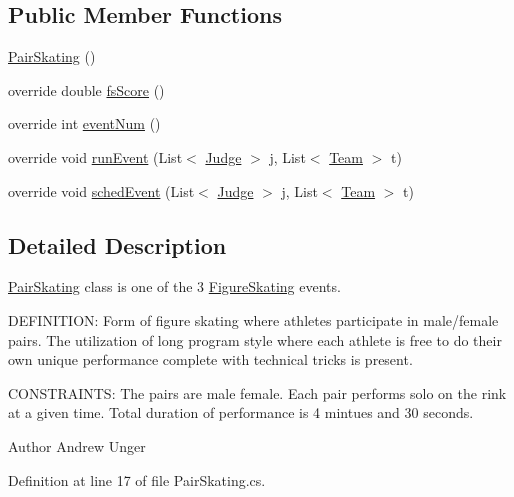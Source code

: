 \subsection*{Public Member Functions}
\begin{DoxyCompactItemize}
\item 
\hyperlink{classPCO_1_1PairSkating_afcb237a5c3a41d42ebe8902b5ef2a4ec}{Pair\+Skating} ()
\item 
override double \hyperlink{classPCO_1_1PairSkating_aaab23d1dec6f01ef77ec808be48d6b75}{fs\+Score} ()
\item 
override int \hyperlink{classPCO_1_1PairSkating_aaf3cda572c411560ddc8f2f44621ff18}{event\+Num} ()
\item 
override void \hyperlink{classPCO_1_1PairSkating_adc75a58b22ce9edd905cbbe06320c9a1}{run\+Event} (List$<$ \hyperlink{classPCO_1_1Judge}{Judge} $>$ j, List$<$ \hyperlink{classPCO_1_1Team}{Team} $>$ t)
\item 
override void \hyperlink{classPCO_1_1PairSkating_a7da01fe6e5c700bc232189087fddf450}{sched\+Event} (List$<$ \hyperlink{classPCO_1_1Judge}{Judge} $>$ j, List$<$ \hyperlink{classPCO_1_1Team}{Team} $>$ t)
\end{DoxyCompactItemize}


\subsection{Detailed Description}
\hyperlink{classPCO_1_1PairSkating}{Pair\+Skating} class is one of the 3 \hyperlink{classPCO_1_1FigureSkating}{Figure\+Skating} events. 

D\+E\+F\+I\+N\+I\+T\+I\+O\+N\+: Form of figure skating where athletes participate in male/female pairs. The utilization of long program style where each athlete is free to do their own unique performance complete with technical tricks is present.

C\+O\+N\+S\+T\+R\+A\+I\+N\+T\+S\+: The pairs are male female. Each pair performs solo on the rink at a given time. Total duration of performance is 4 mintues and 30 seconds.\begin{DoxyAuthor}{Author}
Andrew Unger 
\end{DoxyAuthor}


Definition at line 17 of file Pair\+Skating.\+cs.




